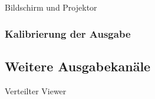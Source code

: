 Bildschirm und Projektor

\subsubsection{Kalibrierung der Ausgabe} %
\label{ssub:kalibrierung_der_ausgabe}


\subsection{Weitere Ausgabekanäle} %
\label{sub:weitere_ausgabekanäle}

Verteilter Viewer


